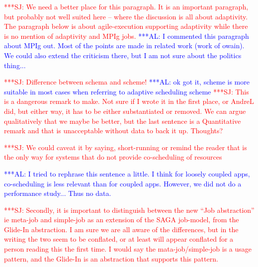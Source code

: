 \documentclass{rspublic}
\newcommand{\alnote}[1]{ {\textcolor{blue} { ***AL: #1 }}}
\newcommand{\jhanote}[1]{ {\textcolor{red} { ***SJ: #1 }}}
\newcommand{\alnote}[1]{}
\newcommand{\jhanote}[1]{}
\newcommand{\glidein}[1]{Glide-In }
\begin{document}

\jhanote{We need a better place for this paragraph. It is an important
  paragraph, but probably not well suited here -- where the discussion
  is all about adaptivity. The paragraph below is about
  agile-execution supporting adaptivity while there is no mention of
  adaptivity and MPIg jobs.}
\alnote{I commented this paragraph about MPIg out. Most of the points are
made in related work (work of owain). We could also extend the criticism
there, but I am not sure about the politics thing...}  



\jhanote{Difference between schema and scheme!}
\alnote{ok got it, scheme is more suitable in most cases when referring to adaptive
scheduling scheme}
\jhanote{This is a dangerous remark to
  make. Not sure if I wrote it in the first place, or AndreL did, but
  either way, it has to be either substantiated or removed. We can
  argue qualitatively that we maybe be better, but the last sentence
  is a Quantitative remark and that is unacceptable without data to
  back it up. Thoughts?}

\jhanote{We could caveat it by saying, short-running or remind the
  reader that is the only way for systems that do not provide
  co-scheduling of resources}

\alnote{I tried to rephrase this sentence a little. I think for loosely coupled
apps, co-scheduling is less relevant than for coupled apps. However,
we did not do a performance study... Thus no data.}   


\jhanote{Secondly, it is important to distinguish between the new
  ``Job abstraction'' ie meta-job and simple-job as an extension of
  the SAGA job-model, from the \glidein\ abstraction. I am sure we are
  all aware of the differences, but in the writing the two seem to be
  conflated, or at least will appear conflated for a person reading
  this the first time. I would say the mata-job/simple-job is a usage
  pattern, and the \glidein\ is an abstraction that supports this
  pattern.}
\end{document}

